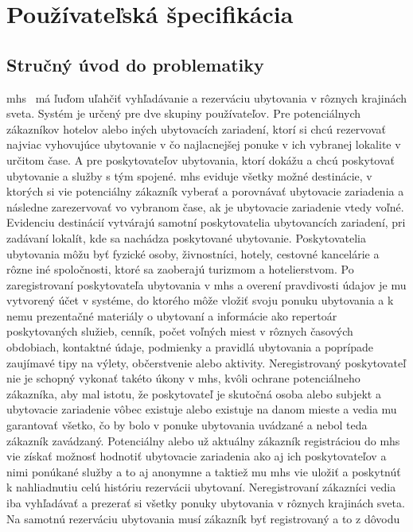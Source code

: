 \section{Používateľská špecifikácia} %
\subsection{Stručný úvod do problematiky}
\acrfull{mhs} \projectName\ má ľuďom uľahčiť vyhľadávanie a rezerváciu 
ubytovania v rôznych krajinách sveta.
Systém je určený pre dve skupiny používateľov. 
Pre potenciálnych zákazníkov hotelov alebo iných ubytovacích zariadení, 
ktorí si chcú rezervovať najviac vyhovujúce ubytovanie v čo najlacnejšej 
ponuke v ich vybranej lokalite v určitom čase. 
A pre poskytovateľov ubytovania, ktorí dokážu a chcú poskytovať ubytovanie 
a služby s tým spojené. 
\acrshort{mhs} eviduje všetky možné destinácie, v ktorých si vie 
potenciálny zákazník vyberať a porovnávať ubytovacie zariadenia a následne 
zarezervovať vo vybranom čase, ak je ubytovacie zariadenie vtedy voľné. 
Evidenciu destinácií vytvárajú samotní poskytovatelia ubytovancích zariadení, 
pri zadávaní lokalít, kde sa nachádza poskytované ubytovanie. 
Poskytovatelia ubytovania môžu byť fyzické osoby, živnostníci, hotely, 
cestovné kancelárie a rôzne iné spoločnosti, ktoré sa zaoberajú turizmom 
a hotelierstvom. 
Po zaregistrovaní poskytovateľa ubytovania v \acrshort{mhs} a overení 
pravdivosti údajov je mu vytvorený účet v systéme, do ktorého môže vložiť 
svoju ponuku ubytovania a k nemu prezentačné materiály o ubytovaní a informácie 
ako repertoár poskytovaných služieb, cenník, počet voľných miest v rôznych 
časových obdobiach, kontaktné údaje, podmienky a pravidlá ubytovania a 
poprípade zaujímavé tipy na výlety, občerstvenie alebo aktivity. 
Neregistrovaný poskytovateľ nie je schopný vykonať takéto úkony v 
\acrshort{mhs}, kvôli ochrane potenciálneho zákazníka, aby mal istotu, že 
poskytovateľ je skutočná osoba alebo subjekt a ubytovacie zariadenie vôbec 
existuje alebo existuje na danom mieste a vedia mu garantovať všetko, 
čo by bolo v ponuke ubytovania uvádzané a nebol teda zákazník zavádzaný. 
Potenciálny alebo už aktuálny zákazník registráciou do \acrshort{mhs} vie 
získať možnosť hodnotiť ubytovacie zariadenia ako aj ich poskytovateľov a 
nimi ponúkané služby a to aj anonymne a taktiež mu \acrshort{mhs} vie uložiť a 
poskytnúť k nahliadnutiu celú históriu rezervácii ubytovaní.
Neregistrovaní zákazníci vedia iba vyhľadávať a prezerať si 
všetky ponuky ubytovania v rôznych krajinách sveta.
Na samotnú rezerváciu ubytovania musí zákazník byť registrovaný a to z dôvodu 
